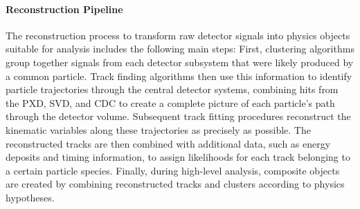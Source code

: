 \paragraph{Reconstruction Pipeline}\label{par:reconstruction-pipeline}
The reconstruction process to transform raw detector signals into physics objects suitable for analysis includes the following main steps:
First, clustering algorithms group together signals from each detector subsystem that were likely produced by a common particle.
Track finding algorithms then use this information to identify particle trajectories through the central detector systems, combining hits from the PXD, SVD, and CDC to create a complete picture of each particle's path through the detector volume.
Subsequent track fitting procedures reconstruct the kinematic variables along these trajectories as precisely as possible.
The reconstructed tracks are then combined with additional data, such as energy deposits and timing information, to assign likelihoods for each track belonging to a certain particle species.
Finally, during high-level analysis, composite objects are created by combining reconstructed tracks and clusters according to physics hypotheses.